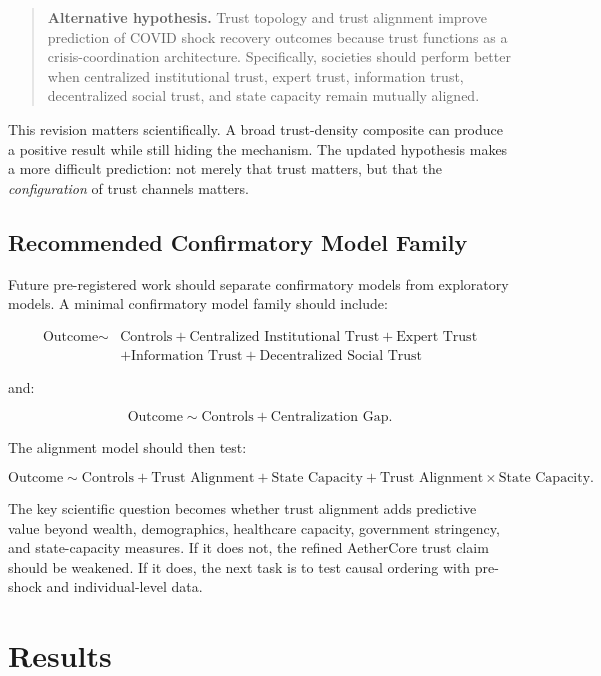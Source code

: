 \documentclass[12pt]{article}
\begin{document}
\begin{quote}
\textbf{Alternative hypothesis.} Trust topology and trust alignment improve prediction of COVID shock recovery outcomes because trust functions as a crisis-coordination architecture. Specifically, societies should perform better when centralized institutional trust, expert trust, information trust, decentralized social trust, and state capacity remain mutually aligned.
\end{quote}

This revision matters scientifically. A broad trust-density composite can produce a positive result while still hiding the mechanism. The updated hypothesis makes a more difficult prediction: not merely that trust matters, but that the \textit{configuration} of trust channels matters.

\subsection{Recommended Confirmatory Model Family}

Future pre-registered work should separate confirmatory models from exploratory models. A minimal confirmatory model family should include:

\begin{align*}
\text{Outcome} \sim{}&
\text{Controls} +
\text{Centralized Institutional Trust} +
\text{Expert Trust} \\
&+
\text{Information Trust} +
\text{Decentralized Social Trust}
\end{align*}

and:

\[
\text{Outcome} \sim
\text{Controls} +
\text{Centralization Gap}.
\]

The alignment model should then test:

\[
\text{Outcome} \sim
\text{Controls} +
\text{Trust Alignment} +
\text{State Capacity} +
\text{Trust Alignment} \times \text{State Capacity}.
\]

The key scientific question becomes whether trust alignment adds predictive value beyond wealth, demographics, healthcare capacity, government stringency, and state-capacity measures. If it does not, the refined AetherCore trust claim should be weakened. If it does, the next task is to test causal ordering with pre-shock and individual-level data.

\section{Results}
\end{document}
